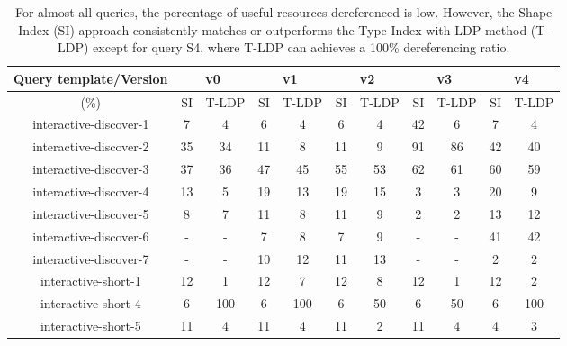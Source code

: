 \begin{table}[htbp]
	\begin{center}
		\begin{tabular}{|c|c|c|c|c|c|c|c|c|c|c|}
			\hline
            \multicolumn{1}{|c}{Query template/Version} & \multicolumn{2}{|c|}{v0} & \multicolumn{2}{|c|}{v1} & \multicolumn{2}{|c|}{v2} & \multicolumn{2}{|c|}{v3} & \multicolumn{2}{|c|}{v4} \\
			\hline
            (\%) & SI  & T-LDP & SI & T-LDP & SI & T-LDP& SI & T-LDP & SI & T-LDP \\
            \hline
			interactive-discover-1 & 7 & 4 & 6 & 4 & 6 &4 & 42 & 6 & 7 & 4 \\
            \hline
            interactive-discover-2 & 35 & 34 & 11 & 8 & 11 & 9 & 91 & 86 & 42 & 40 \\
			\hline
            interactive-discover-3 & 37 & 36 & 47 & 45 & 55 & 53 & 62 & 61 & 60 & 59 \\
			\hline
            interactive-discover-4 & 13 & 5 & 19 & 13 & 19 & 15 & 3 & 3 & 20 & 9 \\
			\hline
            interactive-discover-5 & 8 & 7 & 11 & 8 & 11 & 9 & 2 & 2 & 13 & 12 \\
			\hline
            interactive-discover-6 & - & - & 7 & 8 & 7 & 9 & - & - & 41 & 42 \\
			\hline
            interactive-discover-7 & - & - & 10 & 12 & 11 & 13 & - & - & 2 & 2 \\
			\hline
            interactive-short-1 & 12 & 1 & 12 & 7 & 12 & 8 & 12 & 1 & 12 & 2 \\
			\hline
            interactive-short-4 & 6 & 100 & 6 & 100 & 6 & 50 & 6 & 50 & 6 & 100 \\
			\hline
            interactive-short-5 & 11 & 4 & 11 & 4 & 11 & 2 & 11 & 4 & 4 & 3 \\
			\hline
		\end{tabular}
	\end{center}
	\caption{
        For almost all queries, the percentage of useful resources dereferenced is low. 
        However, the Shape Index (SI) approach consistently matches or outperforms the Type Index with LDP method (T-LDP) except for query S4, where T-LDP can achieves a 100\% dereferencing ratio.
        }
	\label{tab:ratioUsefulResources}
\end{table}